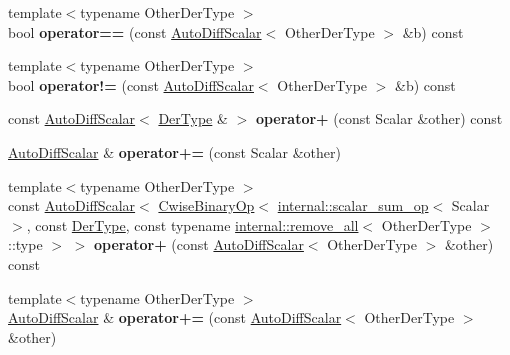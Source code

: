 \begin{DoxyCompactItemize}
{\footnotesize template$<$typename Other\+Der\+Type $>$ }\\bool {\bfseries operator==} (const \hyperlink{class_eigen_1_1_auto_diff_scalar}{Auto\+Diff\+Scalar}$<$ Other\+Der\+Type $>$ \&b) const
\item 
\mbox{\label{class_eigen_1_1_auto_diff_scalar_adb82d0cf1a5105b67014598b8feabd81}} 
{\footnotesize template$<$typename Other\+Der\+Type $>$ }\\bool {\bfseries operator!=} (const \hyperlink{class_eigen_1_1_auto_diff_scalar}{Auto\+Diff\+Scalar}$<$ Other\+Der\+Type $>$ \&b) const
\item 
\mbox{\label{class_eigen_1_1_auto_diff_scalar_a12267b69c364570a39320d8592da94d6}} 
const \hyperlink{class_eigen_1_1_auto_diff_scalar}{Auto\+Diff\+Scalar}$<$ \hyperlink{group___sparse_core___module}{Der\+Type} \& $>$ {\bfseries operator+} (const Scalar \&other) const
\item 
\mbox{\label{class_eigen_1_1_auto_diff_scalar_a4d5eff892114cf0b7ebbfd0747cdef0f}} 
\hyperlink{class_eigen_1_1_auto_diff_scalar}{Auto\+Diff\+Scalar} \& {\bfseries operator+=} (const Scalar \&other)
\item 
\mbox{\label{class_eigen_1_1_auto_diff_scalar_a476a55b11b3869b3908d164e19feeaff}} 
{\footnotesize template$<$typename Other\+Der\+Type $>$ }\\const \hyperlink{class_eigen_1_1_auto_diff_scalar}{Auto\+Diff\+Scalar}$<$ \hyperlink{group___core___module_class_eigen_1_1_cwise_binary_op}{Cwise\+Binary\+Op}$<$ \hyperlink{struct_eigen_1_1internal_1_1scalar__sum__op}{internal\+::scalar\+\_\+sum\+\_\+op}$<$ Scalar $>$, const \hyperlink{group___sparse_core___module}{Der\+Type}, const typename \hyperlink{struct_eigen_1_1internal_1_1remove__all}{internal\+::remove\+\_\+all}$<$ Other\+Der\+Type $>$\+::type $>$ $>$ {\bfseries operator+} (const \hyperlink{class_eigen_1_1_auto_diff_scalar}{Auto\+Diff\+Scalar}$<$ Other\+Der\+Type $>$ \&other) const
\item 
\mbox{\label{class_eigen_1_1_auto_diff_scalar_a59158e59cc37f2ca74a3588f04e4f607}} 
{\footnotesize template$<$typename Other\+Der\+Type $>$ }\\\hyperlink{class_eigen_1_1_auto_diff_scalar}{Auto\+Diff\+Scalar} \& {\bfseries operator+=} (const \hyperlink{class_eigen_1_1_auto_diff_scalar}{Auto\+Diff\+Scalar}$<$ Other\+Der\+Type $>$ \&other)

\end{DoxyCompactItemize}
